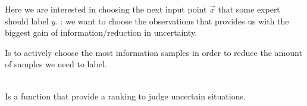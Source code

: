 \begin{sectionbox}\nospacing
  Here we are interested in choosing the next input point $\vec{x}$
  that some expert should label $y$.
  : we want to choose the observations that provides us with the biggest gain of information/reduction in uncertainty.
\end{sectionbox}
\begin{defnbox}\nospacing
  \begin{defn}\label{defn:active_learning}
    Is to actively choose the most information samples in order to reduce the
    amount of samples we need to label.
  \end{defn}
\end{defnbox}
\begin{defnbox}\nospacing
  \begin{defn}\label{defn:utility_function}\leavevmode\\
    Is a function that provide a ranking to judge uncertain situations.
  \end{defn}
\end{defnbox}

